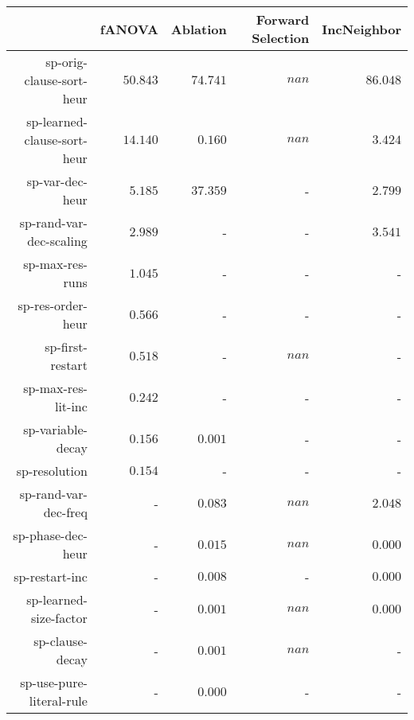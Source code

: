 \begin{table}
\begin{tabular}{r|r|r|r|r}
\toprule
                            &      fANOVA       &     Ablation      & Forward Selection &    IncNeighbor   \\
\hline
sp-orig-clause-sort-heur    & $         50.843$ & $         74.741$ & $            nan$ & $         86.048$\\
sp-learned-clause-sort-heur & $         14.140$ & $          0.160$ & $            nan$ & $          3.424$\\
sp-var-dec-heur             & $          5.185$ & $         37.359$ &                 - & $          2.799$\\
sp-rand-var-dec-scaling     & $          2.989$ &                 - &                 - & $          3.541$\\
sp-max-res-runs             & $          1.045$ &                 - &                 - &                 -\\
sp-res-order-heur           & $          0.566$ &                 - &                 - &                 -\\
sp-first-restart            & $          0.518$ &                 - & $            nan$ &                 -\\
sp-max-res-lit-inc          & $          0.242$ &                 - &                 - &                 -\\
sp-variable-decay           & $          0.156$ & $          0.001$ &                 - &                 -\\
sp-resolution               & $          0.154$ &                 - &                 - &                 -\\
sp-rand-var-dec-freq        &                 - & $          0.083$ & $            nan$ & $          2.048$\\
sp-phase-dec-heur           &                 - & $          0.015$ & $            nan$ & $          0.000$\\
sp-restart-inc              &                 - & $          0.008$ &                 - & $          0.000$\\
sp-learned-size-factor      &                 - & $          0.001$ & $            nan$ & $          0.000$\\
sp-clause-decay             &                 - & $          0.001$ & $            nan$ &                 -\\
sp-use-pure-literal-rule    &                 - & $          0.000$ &                 - &                 -\\

\end{tabular}
\end{table}
